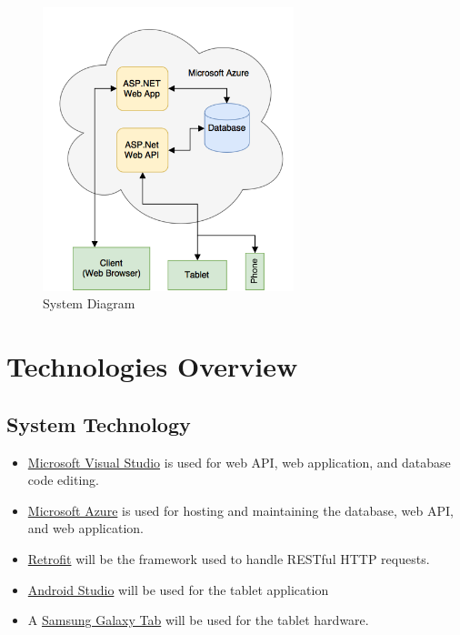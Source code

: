 \begin{figure}[tbh]
\begin{center}
\includegraphics[width=0.65\textwidth]{./DesignImages/OverallDataFlowChp1.png}
\end{center}
\caption{System Diagram \label{systemdiagram}}
\end{figure}

\section{Technologies Overview}
\subsection{System Technology}
\begin{itemize}
\item \href{https://www.visualstudio.com/}{Microsoft Visual Studio} is used for web API, web application, and database code editing.
\item \href{https://azure.microsoft.com/en-us/}{Microsoft Azure} is used for hosting and maintaining the database, web API, and web application.
\item \href{http://square.github.io/retrofit/}{Retrofit} will be the framework used to handle RESTful HTTP requests.
\item \href{https://developer.android.com/studio/index.html}{Android Studio} will be used for the tablet application
\item A \href{http://www.samsung.com/us/mobile/tablets/all-other-tablets/samsung-galaxy-tab-a-8-0-16gb-wi-fi-smoky-titanium-sm-t350nzaaxar/}{Samsung Galaxy Tab} will be used for the tablet hardware.
\end{itemize}


